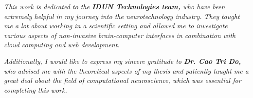 \begin{dedication}

    \textit{This work is dedicated to the \textbf{IDUN Technologies team,} who have been extremely helpful in my journey into the neurotechnology industry. They taught me a lot about working in a scientific setting and allowed me to investigate various aspects of non-invasive brain-computer interfaces in combination with cloud computing and web development.}

    \hfill \break

    \textit{Additionally, I would like to express my sincere gratitude to \textbf{Dr. Cao Tri Do,} who advised me with the theoretical aspects of my thesis and patiently taught me a great deal about the field of computational neuroscience, which was essential for completing this work.}

\end{dedication}

